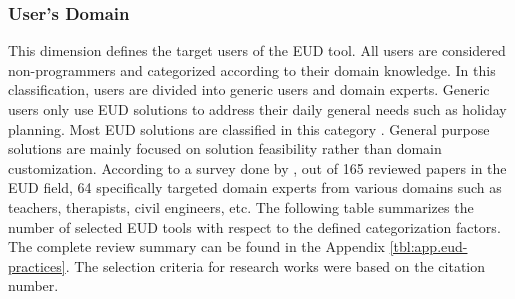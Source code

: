 \hypertarget{user-domain}{%
\subsubsection*{User’s Domain}\label{user-domain}}
This dimension defines the target users of the EUD tool. All users are
considered non-programmers and categorized according to their domain
knowledge. In this classification, users are divided into generic users
and domain experts. Generic users only use EUD solutions to address
their daily general needs such as holiday planning. Most EUD solutions
are classified in this category \autocite{Santos2019}. General
purpose solutions are mainly focused on solution feasibility rather than
domain customization. According to a survey done by \autocite{Barricelli2019}, out of 165 reviewed papers in the EUD field, 64 specifically
targeted domain experts from various domains such as teachers,
therapists, civil engineers, etc.
The following table summarizes the number of selected EUD tools with respect
to the defined categorization factors. The complete review summary can
be found in the Appendix \cref{tbl:app.eud-practices}. The selection criteria for research works were
based on the citation number.

